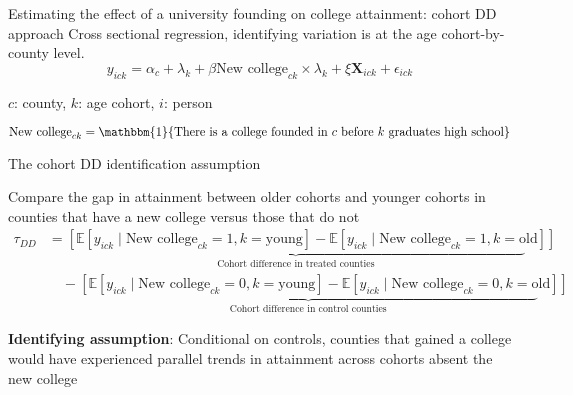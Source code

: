 \documentclass[notes,11pt, aspectratio=169]{beamer}
\newenvironment{wideitemize}{\itemize\addtolength{\itemsep}{10pt}}{\enditemize}
\begin{document}
\begin{frame}{Estimating the effect of a university founding on college attainment: cohort DD approach}
  Cross sectional regression, identifying variation is at the age cohort-by-county level.
  \begin{equation}
    y_{ick} = \alpha_c + \lambda_k + \beta \text{New college}_{ck}\times \lambda_k +\xi \bm{X}_{ick} + \epsilon_{ick}
  \end{equation}
  \begin{wideitemize}
    \item $c$: county, $k$: age cohort, $i$: person
    \item $\text{New college}_{ck} = \mathbbm{1}\{\text{There is a college founded in $c$ before $k$ graduates high school}\}$
  \end{wideitemize}
\end{frame}

\begin{frame}{The cohort DD identification assumption}
\begin{wideitemize}
  \item Compare the gap in attainment between older cohorts and younger cohorts in counties that have a new college versus those that do not
 \begin{align}
 \tau_{DD} &= \underbrace{\left[\mathbb{E}[y_{ick} \mid \text{New college}_{ck} = 1, k = \text{young}] - \mathbb{E}[y_{ick} \mid \text{New college}_{ck} = 1, k = \text{old}]\right]}_{\text{Cohort difference in treated counties}} \nonumber \\
 &\quad - \underbrace{\left[\mathbb{E}[y_{ick} \mid \text{New college}_{ck} = 0, k = \text{young}] - \mathbb{E}[y_{ick} \mid \text{New college}_{ck} = 0, k = \text{old}]\right]}_{\text{Cohort difference in control counties}}
\end{align}
  \item \textbf{Identifying assumption}: Conditional on controls, counties that gained a college would have experienced parallel trends in attainment across cohorts absent the new college
\end{wideitemize}
\end{frame}
\end{document}
